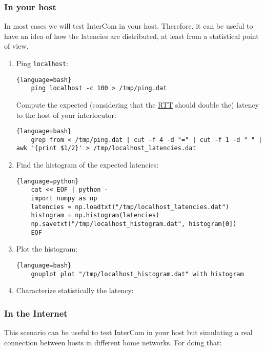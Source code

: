 \subsubsection{In your host}

In most cases we will test InterCom in your host. Therefore, it can be
useful to have an idea of how the latencies are distributed, at least
from a statistical point of view.

\begin{enumerate}
\item Ping \texttt{localhost}:
   \begin{lstlisting}{language=bash}
    ping localhost -c 100 > /tmp/ping.dat
  \end{lstlisting}
Compute the expected (considering that the
  \href{https://en.wikipedia.org/wiki/Round-trip_delay}{RTT} should
  double the) latency to the host of your interlocutor:
  \begin{lstlisting}{language=bash}
    grep from < /tmp/ping.dat | cut -f 4 -d "=" | cut -f 1 -d " " | awk '{print $1/2}' > /tmp/localhost_latencies.dat
  \end{lstlisting}

\item Find the histogram of the expected latencies:
  \begin{lstlisting}{language=python}
    cat << EOF | python -
    import numpy as np
    latencies = np.loadtxt("/tmp/localhost_latencies.dat")
    histogram = np.histogram(latencies)
    np.savetxt("/tmp/localhost_histogram.dat", histogram[0])
    EOF
  \end{lstlisting}

\item Plot the histogram:
  \begin{lstlisting}{language=bash}
    gnuplot plot "/tmp/localhost_histogram.dat" with histogram
  \end{lstlisting}
  
\item Characterize statistically the latency:
\end{enumerate}

\subsubsection{In the Internet}

This scenario can be useful to test InterCom in your host but
simulating a real connection between hosts in different home
networks. For doing that:

